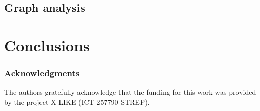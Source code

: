 \documentclass{article} %
\begin{document}
\subsection{Graph analysis}



\section{Conclusions}



\subsubsection*{Acknowledgments}
The authors gratefully acknowledge that the funding for this work was provided by the project X-LIKE (ICT-257790-STREP)\cite{xlike}.





\end{document}
